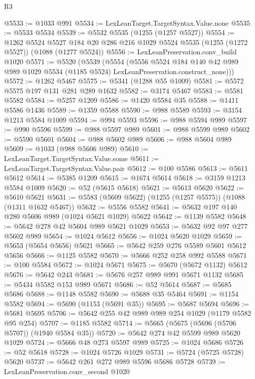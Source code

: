 \begin{lexlean}{R3}
\begin{coremodule}
@5533 := @1033 @991
@5534 := LexLeanTarget.TargetSyntax.Value.none
@5535 := @5533 @5534
@5539 := @5532 @5535 (@1255 (@1257 @5527))
@5554 := @1262
    @5524
    @5527
    @184
    @20
    @286
    @216
    @1029
    @5524
    @5535
    (@1255 (@1272 @5527))
    (@1088 (@1277 @5524))
@5556 := LexLeanPreservation.conv_build @1020
@5571 := @5520
    (@5539
      (@5554
        (@5556
          @5524
          @184
          @140
          @42
          @989
          @989
          @1029
          @5534
          (@1185 @5524)
          LexLeanPreservation.construct_none)))
@5572 := @1262 @5467
@5575 := @5341 (@1288 @55 @1009)
@5581 := @5572 @5575 @197 @131 @281 @289 @1632
@5582 := @3174 @5467
@5583 := @5581 @5582
@5584 := @5257 @1209
@5586 := @1420 @5584 @35
@5588 := @1411 @5586 @1436
@5589 := @1359 @5588
@5590 := @988 @5589
@5593 := @3154 @1213 @5584 @1009
@5594 := @994 @5593
@5596 := @988 @5594 @989
@5597 := @990 @5596
@5599 := @988 @5597 @989
@5601 := @988 @5599 @989
@5602 := @5590 @5601
@5604 := @988 @5602 @989
@5606 := @988 @5604 @989
@5609 := @1033 (@988 @5606 @989)
@5610 := LexLeanTarget.TargetSyntax.Value.some
@5611 := LexLeanTarget.TargetSyntax.Value.pair
@5612 := @100 @5586
@5613 := @5611 @5612
@5614 := @5385 @1209
@5615 := @1674 @5614
@5618 := @3159 @1213 @5584 @1009
@5620 := @52 (@5615 @5618)
@5621 := @5613 @5620
@5622 := @5610 @5621
@5631 := @5583 (@5609 @5622) (@1255 (@1257 @5575)) (@1088 (@1311 @1632 @5467))
@5632 := @5556 @5582
@5641 := @5632 @197 @140 @280 @5606 @989 (@1024 @5621 @1029) @5622
@5642 := @1139 @5582
@5648 := @5642 @278 @42 @5604 @989 @5621 @1029
@5653 := @5632 @92 @97 @277 @5602 @989
@5654 := @1024 @5612
@5656 := @1024 @5620 @1029
@5659 := @5653 (@5654 @5656) @5621
@5665 := @5642 @259 @276 @5589 @5601 @5612 @5656
@5666 := @1125 @5582
@5670 := @5666 @252 @258 @992 @5588
@5671 := @100 @5584
@5672 := @1024 @5671
@5675 := @5670 (@5672 @1132) @5612
@5676 := @5642 @243
@5681 := @5676 @257 @989 @991 @5671 @1132
@5685 := @5434 @5582 @153 @989 @5671
@5686 := @52 @5614
@5687 := @5685 @5686
@5688 := @1148 @5582
@5690 := @5688 @35 @5464
@5691 := @1154 @5582
@5694 := @5690 (@1153 (@5691 @35))
@5695 := @5687 @5694
@5696 := @5681 @5695
@5706 := @5642 @255 @42 @989 @989 @254 @1029 (@1179 @5582 @95 @254)
@5707 := @1185 @5582
@5714 := @5665 (@5675 (@5696 (@5706 @5707)) (@1940 @5584 @35))
@5720 := @5642 @274 @42 @5599 @989 @5620 @1029
@5724 := @5666 @48 @273 @5597 @989
@5725 := @1024 @5686
@5726 := @52 @5618
@5728 := @1024 @5726 @1029
@5731 := @5724 (@5725 @5728) @5620
@5737 := @5642 @261 @272 @989 @5596 @5686 @5728
@5739 := LexLeanPreservation.conv_second @1020

\end{coremodule}
\end{lexlean}
